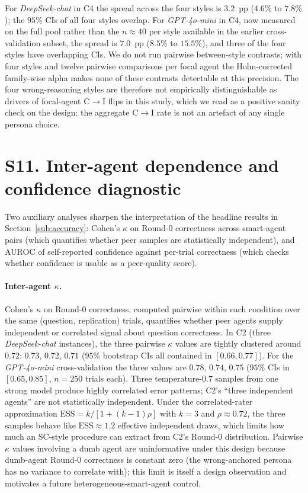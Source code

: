 \documentclass[11pt]{article}
\begin{document}
For \textit{DeepSeek-chat} in C4 the spread across the four
styles is $3.2$~pp ($4.6\%$ to $7.8\%$); the $95\%$ CIs of all four
styles overlap.
For \textit{GPT-4o-mini} in C4, now measured on the full pool rather than the
$n\approx40$ per style available in the earlier cross-validation subset, the
spread is $7.0$~pp ($8.5\%$ to $15.5\%$), and three of the four styles have
overlapping CIs.
We do not run pairwise between-style contrasts; with four styles and
twelve pairwise comparisons per focal agent the Holm-corrected
family-wise alpha makes none of these contrasts detectable at this
precision.
The four wrong-reasoning styles are therefore not empirically
distinguishable as drivers of focal-agent C$\rightarrow$I flips in
this study, which we read as a positive sanity check on the design:
the aggregate C$\rightarrow$I rate is not an artefact of any single
persona choice.

\section*{S11. Inter-agent dependence and confidence diagnostic}
\label{ssec:dependence_app}

Two auxiliary analyses sharpen the interpretation of the headline
results in Section~\ref{sub:accuracy}: Cohen's $\kappa$ on Round-0
correctness across smart-agent pairs (which quantifies whether peer
samples are statistically independent), and AUROC of self-reported
confidence against per-trial correctness (which checks whether
confidence is usable as a peer-quality score).

\paragraph{Inter-agent $\kappa$.}
Cohen's $\kappa$ on Round-0 correctness, computed pairwise within
each condition over the same (question, replication) trials,
quantifies whether peer agents supply independent or correlated
signal about question correctness.
In C2 (three \textit{DeepSeek-chat} instances), the three
pairwise $\kappa$ values are tightly clustered around $0.72$:
$0.73$, $0.72$, $0.71$ ($95\%$ bootstrap CIs all contained in
$[0.66, 0.77]$).
For the \textit{GPT-4o-mini} cross-validation the three values are
$0.78$, $0.74$, $0.75$ ($95\%$ CIs in $[0.65, 0.85]$,
$n = 250$ trials each).
Three temperature-$0.7$ samples from one strong model produce highly
correlated error patterns; C2's ``three independent agents'' are not
statistically independent.
Under the correlated-rater approximation
$\mathrm{ESS} = k / [1 + (k-1)\rho]$ with $k = 3$ and
$\rho \approx 0.72$, the three samples behave like
$\mathrm{ESS} \approx 1.2$ effective independent draws, which limits
how much an SC-style procedure can extract from C2's Round-0
distribution.
Pairwise $\kappa$ values involving a dumb agent are uninformative
under this design because dumb-agent Round-0 correctness is constant
zero (the wrong-anchored persona has no variance to correlate with);
this limit is itself a design observation and motivates a future
heterogeneous-smart-agent control.
\end{document}
